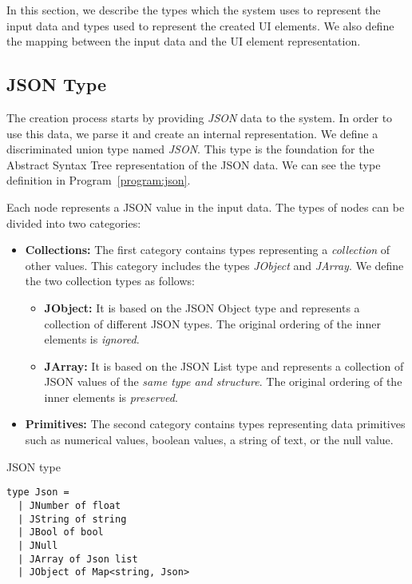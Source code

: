 In this section, we describe the types which the system uses to represent the input data and types used to represent the created UI elements.
We also define the mapping between the input data and the UI element representation.


\subsection{JSON Type}
\label{sub:json}
The creation process starts by providing \emph{JSON} data to the system.
In order to use this data, we parse it and create an internal representation.
We define a discriminated union type named \emph{JSON}.
This type is the foundation for the Abstract Syntax Tree representation of the JSON data.
We can see the type definition in Program~\ref{program:json}.


Each node represents a JSON value in the input data.
The types of nodes can be divided into two categories:
\begin{itemize}
	\item {\textbf{Collections:} The first category contains types representing a \emph{collection} of other values. This category includes the types \emph{JObject} and \emph{JArray}.
	      We define the two collection types as follows:
	      \begin{itemize}
		      \item \textbf{JObject:} It is based on the JSON Object type and represents a collection of different JSON types. The original ordering of the inner elements is \emph{ignored}.
		      \item \textbf{JArray:} It is based on the JSON List type and represents a collection of JSON values of the \emph{same type and structure}. The original ordering of the inner elements is \emph{preserved}.
	      \end{itemize}
	      }
	\item \textbf{Primitives:} The second category contains types representing data primitives such as numerical values, boolean values,
	      a string of text, or the null value.
\end{itemize}

\begin{listing}[h]
	\label{program:json}
	\caption {JSON type}
	\begin{lstlisting}
type Json =
  | JNumber of float
  | JString of string
  | JBool of bool
  | JNull
  | JArray of Json list
  | JObject of Map<string, Json>
  \end{lstlisting}
\end{listing}

